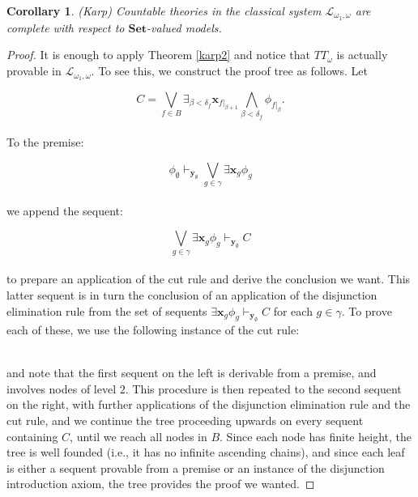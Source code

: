 \documentclass[a4paper,11pt]{article}
\theoremstyle{plain}
\newtheorem{cor}[thm]{Corollary}
\theoremstyle{plain}
\theoremstyle{remark}
\newcommand{\Sets}{\ensuremath{\mathbf{Set}}}
\begin{document}
\begin{cor}\label{karp3}
 (Karp) Countable theories in the classical system $\mathcal{L}_{\omega_1, \omega}$ are complete with respect to \Sets-valued models.
\end{cor}

\begin{proof}
 It is enough to apply Theorem \ref{karp2} and notice that $TT_{\omega}$ is actually provable in $\mathcal{L}_{\omega_1, \omega}$. To see this, we construct the proof tree as follows. Let 
 
$$C=\bigvee_{f \in B}  \exists_{\beta<\delta_f}\mathbf{x}_{f|_{\beta +1}} \bigwedge_{\beta<\delta_f}\phi_{f|_\beta}.$$
\\
To the premise:
 
$$\phi_{\emptyset} \vdash_{\mathbf{y}_{\emptyset}} \bigvee_{g \in \gamma} \exists \mathbf{x}_{g} \phi_{g}$$
\\
we append the sequent:

$$\bigvee_{g \in \gamma} \exists \mathbf{x}_{g} \phi_{g} \vdash_{\mathbf{y}_{\emptyset}} C$$
\\
to prepare an application of the cut rule and derive the conclusion we want. This latter sequent is in turn the conclusion of an application of the disjunction elimination rule from the set of sequents $\exists \mathbf{x}_{g} \phi_{g} \vdash_{\mathbf{y}_{\emptyset}} C$ for each $g \in \gamma$. To prove each of these, we use the following instance of the cut rule:

\begin{mathpar}
\end{mathpar}
\\
and note that the first sequent on the left is derivable from a premise, and involves nodes of level $2$. This procedure is then repeated to the second sequent on the right, with further applications of the disjunction elimination rule and the cut rule, and we continue the tree proceeding upwards on every sequent containing $C$, until we reach all nodes in $B$. Since each node has finite height, the tree is well founded (i.e., it has no infinite ascending chains), and since each leaf is either a sequent provable from a premise or an instance of the disjunction introduction axiom, the tree provides the proof we wanted.
\end{proof}
\end{document}
